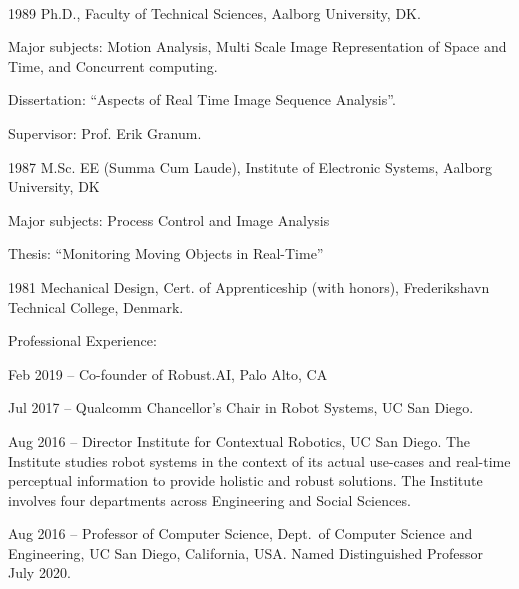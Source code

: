 \documentclass{article}
\newenvironment{sublist}{%
  \begin{list}{}{%
      \setlength{\itemsep}{0em}\setlength{\parsep}{0em}%
      \setlength{\topsep}{0em}\setlength{\parskip}{0em}%
    }%
}%
{ \end{list} }
\begin{document}
\begin{cv}
  \begin{cvlist}{~}
  \item[1989] Ph.D., Faculty of Technical Sciences, Aalborg
    University, DK.
    \begin{sublist}
    \item Major subjects: Motion Analysis, Multi Scale Image
      Representation of Space and Time, and Concurrent computing.
    \item Dissertation: ``Aspects of Real Time Image Sequence
      Analysis''.
    \item Supervisor: Prof. Erik Granum.
    \end{sublist}
  \item[1987] M.Sc. EE (Summa Cum Laude), Institute of Electronic
    Systems, Aalborg University, DK
    \begin{sublist}
    \item Major subjects: Process Control and Image Analysis
    \item Thesis: ``Monitoring Moving Objects in Real-Time''
    \end{sublist}
  \item[1981] Mechanical Design, Cert.
    of Apprenticeship (with honors), Frederikshavn Technical
    College, Denmark.
\end{cvlist}



\begin{cvlist}{Professional Experience:}

\item[Feb 2019 --] Co-founder of Robust.AI, Palo Alto, CA

\item[Jul 2017 --] Qualcomm Chancellor's Chair in Robot Systems, UC San Diego.

\item[Aug 2016 --] Director Institute for Contextual Robotics, UC San
  Diego. The Institute studies robot systems in the context of its
  actual use-cases and real-time perceptual information to provide
  holistic and robust solutions. The Institute involves four
  departments across Engineering and Social Sciences.

\item[Aug 2016 --] Professor of Computer Science, Dept.\ of Computer
  Science and Engineering, UC San Diego, California, USA. Named
  Distinguished Professor July 2020.


\end{cvlist}
\end{cv}
\end{document}
